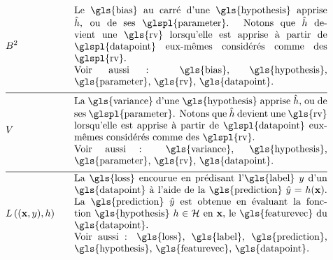 \begin{align}
	& \biasterm^2 & \quad & \parbox{.75\textwidth}{Le \gls{bias} au carré d’une \gls{hypothesis} apprise $\learnthypothesis$, ou de ses \glspl{parameter}. 
		Notons que $\learnthypothesis$ devient une \gls{rv} lorsqu’elle est apprise à partir de \glspl{datapoint} 
		eux-mêmes considérés comme des \glspl{rv}.
		\\ Voir aussi : \gls{bias}, \gls{hypothesis}, \gls{parameter}, \gls{rv}, \gls{datapoint}.
	} \nonumber \\[2mm] \hline \nonumber\\[-5mm]
	& \varianceterm & \quad & \parbox{.75\textwidth}{La \gls{variance} d’une \gls{hypothesis} apprise $\learnthypothesis$, ou de ses \glspl{parameter}. 
		Notons que $\learnthypothesis$ devient une \gls{rv} lorsqu’elle est apprise à partir de \glspl{datapoint} 
		eux-mêmes considérés comme des \glspl{rv}.
		\\ Voir aussi : \gls{variance}, \gls{hypothesis}, \gls{parameter}, \gls{rv}, \gls{datapoint}.
	} \nonumber \\[2mm] \hline \nonumber\\[-5mm]
	& \lossfunc{(\featurevec,\truelabel)}{\hypothesis} & \quad & \parbox{.75\textwidth}{La \gls{loss} encourue en prédisant l'\gls{label} $\truelabel$ d’un \gls{datapoint} à l’aide de la \gls{prediction} $\hat{\truelabel}=h(\featurevec)$. La \gls{prediction} $\hat{\truelabel}$ est obtenue en évaluant la fonction \gls{hypothesis} $\hypothesis \in \hypospace$ en $\featurevec$, le \gls{featurevec} du \gls{datapoint}. \\ Voir aussi : \gls{loss}, \gls{label}, \gls{prediction}, \gls{hypothesis}, \gls{featurevec}, \gls{datapoint}.} \nonumber
\end{align}

